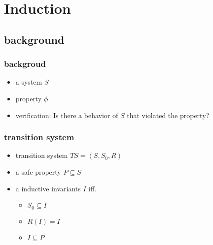 \section{Induction}
\subsection{background}
\begin{frame}
    \frametitle{backgroud}
    \begin{itemize}
        \item a system $S$
        \item property $\phi$
        \item verification: Is there a behavior of $S$ that violated the property?
    \end{itemize}
\end{frame}
\begin{frame}
    \frametitle{transition system}
    \begin{itemize}
        \item transition system $TS=(S,S_{0},R)$
        \item a safe property $P\subseteq S$
        \item a inductive invariants $I$ iff.
        \begin{itemize}
            \item $S_{0}\subseteq I$
            \item $R(I)=I$
            \item $I\subseteq P$
        \end{itemize}
    \end{itemize}
\end{frame}

